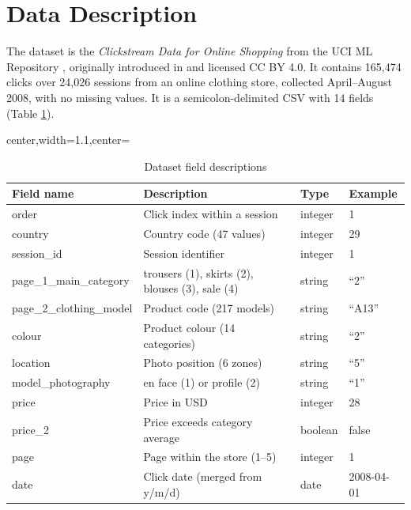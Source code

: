 \documentclass[a4paper,oneside,12pt]{book}
\begin{document}
\section{Data Description}

The dataset is the \textit{Clickstream Data for Online Shopping} from the UCI ML Repository \cite{clickstream_data_for_online_shopping_553}, originally introduced in \cite{lapczynski2013discovering} and licensed CC BY 4.0. It contains 165,474 clicks over 24,026 sessions from an online clothing store, collected April--August 2008, with no missing values. It is a semicolon-delimited CSV with 14 fields (Table \ref{table:data_description}).

\begin{table}[H]
\footnotesize
\caption{Dataset field descriptions}
\label{table:data_description}
\begin{adjustbox}{center,width=1.1\textwidth,center=\textwidth}
    \begin{tabular}{p{3.8cm}p{6.5cm}p{1.2cm}p{1.8cm}}
    \toprule
         Field name & Description & Type & Example \\
         \midrule
         order & Click index within a session & integer & 1 \\
         country & Country code (47 values) & integer & 29 \\
         session\_id & Session identifier & integer & 1 \\
         page\_1\_main\_category  & trousers (1), skirts (2), blouses (3), sale (4) & string & ``2'' \\
         page\_2\_clothing\_model & Product code (217 models) & string & ``A13'' \\
         colour & Product colour (14 categories) & string & ``2'' \\
         location & Photo position (6 zones) & string & ``5'' \\
         model\_photography & en face (1) or profile (2) & string & ``1'' \\
         price & Price in USD & integer & 28 \\
         price\_2 & Price exceeds category average & boolean & false \\
         page & Page within the store (1--5) & integer & 1 \\
         date & Click date (merged from y/m/d) & date & 2008-04-01 \\
    \bottomrule
    \end{tabular}
\end{adjustbox}
\end{table}
\end{document}

